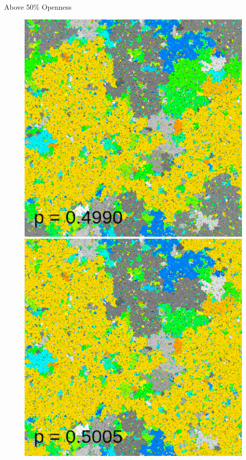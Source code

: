 \documentclass[aspectratio=169, handout]{beamer}
\begin{document}
\begin{frame}{Above 50\% Openness}
\begin{figure}
\includegraphics[scale=0.22]{percolation-gif/percolation-1-72.png}
\includegraphics[scale=0.22]{percolation-gif/percolation-1-75.png}

\end{figure}
\end{frame}
\end{document}
